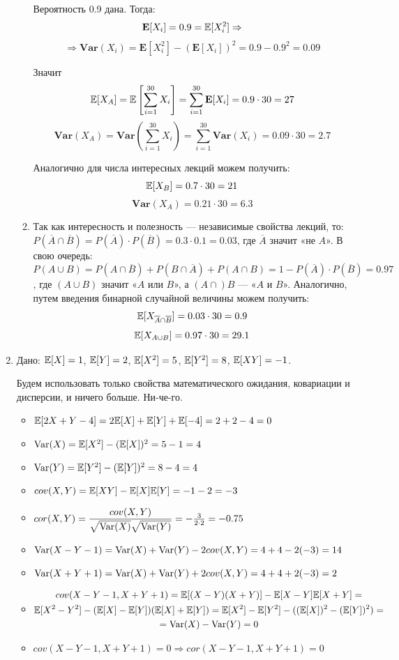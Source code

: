 \documentclass[12pt, a4paper]{article}\usepackage[]{graphicx}\usepackage[]{color}
\begin{document}
\begin{enumerate}
\begin{enumerate}
Вероятность 0.9 дана. Тогда:
$$
\mathbf{E}[X_i] = 0.9 = \mathbb{E}[X^2_i] \Rightarrow
$$
$$
\Rightarrow \mathbf{Var}(X_i) = \mathbf{E}[X^2_i] - (\mathbf{E}[X_i])^2 = 0.9 - 0.9^2 = 0.09
$$

Значит
$$
\mathbb{E}[X_A] = \mathbb{E}\left[\sum\limits_{i=1}^{30}X_i\right] = \sum\limits_{i=1}^{30}\mathbf{E}[X_i]  = 0.9\cdot30 = 27
$$
$$
\mathbf{Var}(X_A) = \mathbf{Var}\left(\sum\limits_{i=1}^{30}X_i\right) = \sum\limits_{i=1}^{30}\mathbf{Var}(X_i) = 0.09\cdot30 = 2.7
$$

Аналогично для числа интересных лекций можем получить:
$$
\mathbb{E}[X_B] = 0.7\cdot 30 = 21
$$
$$
\mathbf{Var}(X_A) = 0.21\cdot 30 = 6.3
$$


\item Так как интересность и полезность — независимые свойства лекций, то:\\
 $P(\overline{A} \cap \overline{B}) = P(\overline{A})\cdot P(\overline{B}) = 0.3\cdot0.1 = 0.03$, где $\overline{A}$ значит «не $A$». В свою очередь:\\
 $P(A\cup B) = P(A\cap\overline{B}) + P(B\cap\overline{A}) + P(A\cap B) = 1 - P(\overline{A})\cdot P(\overline{B}) = 0.97$ , где $(A\cup B)$ значит «$A$ или $B$», а $(A\cap)B$ — «$A$ и $B$». Аналогично, путем введения бинарной случайной величины можем получить:
 $$
 \mathbb{E}[X_{\overline{A} \cap \overline{B}}] = 0.03 \cdot  30 = 0.9
 $$
 $$
 \mathbb{E}[X_{A\cup B}] = 0.97\cdot30 = 29.1
$$

\end{enumerate}

\item
Дано: $\mathbb{E}[X] = 1$, $\mathbb{E}[Y] = 2$, $\mathbb{E}[X^2] = 5$, $\mathbb{E}[Y^2] = 8$, $\mathbb{E}[XY] = -1$.

Будем использовать только свойства математического ожидания, ковариации и дисперсии, и ничего больше. Ни-че-го.

\begin{itemize}
\item  $\mathbb{E}[2X + Y - 4] = 2\mathbb{E}[X] + \mathbb{E}[Y] + \mathbb{E}[-4] = 2 + 2 - 4 = 0 $
\item $\operatorname{Var}(X) = \mathbb{E}[X^2] - (\mathbb{E}[X])^2 = 5 - 1 = 4 $
\item $\operatorname{Var}(Y) = \mathbb{E}[Y^2] - (\mathbb{E}[Y])^2 = 8 - 4 = 4 $
\item $cov(X, Y) = \mathbb{E}[XY] - \mathbb{E}[X]\mathbb{E}[Y] = -1 - 2 = -3$
\item $cor(X, Y) = \dfrac{cov(X, Y)}{\sqrt{\operatorname{Var}(X)}\sqrt{\operatorname{Var}(Y)}} = -\frac{3}{2\cdot 2} = -0.75$
\item $\operatorname{Var}(X-Y-1) = \operatorname{Var}(X) + \operatorname{Var}(Y) - 2cov(X, Y) = 4+4 -2(-3) = 14$
\item $\operatorname{Var}(X+Y+1) = \operatorname{Var}(X) + \operatorname{Var}(Y) + 2cov(X, Y) = 4+4+2(-3) =2 $
\item \begin{multline}
cov(X-Y-1, X+Y+1)=\mathbb{E}[(X-Y)(X+Y)]-\mathbb{E}[X-Y]\mathbb{E}[X+Y] = \\
\mathbb{E}[X^2-Y^2] - (\mathbb{E}[X]-\mathbb{E}[Y])(\mathbb{E}[X] + \mathbb{E}[Y]) =
\mathbb{E}[X^2] - \mathbb{E}[Y^2] - ((\mathbb{E}[X])^2 -(\mathbb{E}[Y])^2)=\\
 = \operatorname{Var}(X)-\operatorname{Var}(Y) = 0
 \end{multline}
 \item $cov(X-Y-1, X+Y+1)=0 \Rightarrow cor(X-Y-1, X+Y+1) = 0 $
\end{itemize}


\end{enumerate}
\end{document}
